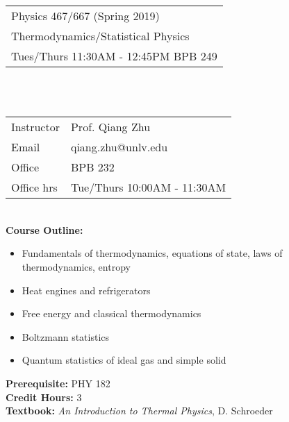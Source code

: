 %
\begin{tabular}{ l }
  \LARGE Physics 467/667 (Spring 2019)\\
  \LARGE Thermodynamics/Statistical Physics \\
  \LARGE Tues/Thurs 11:30AM - 12:45PM BPB 249 \\
\end{tabular}\\\\

\begin{tabular}{ l l }
  \large Instructor &\large Prof. Qiang Zhu \\
  \large Email      &\large qiang.zhu@unlv.edu \\
  \large Office     &\large BPB 232 \\
  \large Office hrs &\large Tue/Thurs 10:00AM - 11:30AM \\
\end{tabular}\\

\textbf {Course Outline:}
\begin{itemize} 
\item Fundamentals of thermodynamics, equations of state, laws of thermodynamics, entropy
\item Heat engines and refrigerators
\item Free energy and classical thermodynamics
\item Boltzmann statistics
\item Quantum statistics of ideal gas and simple solid
\end{itemize}

\textbf {Prerequisite:} PHY 182\\
\textbf {Credit Hours:} 3 \\
\textbf {Textbook:} \emph{An Introduction to Thermal Physics}, D. Schroeder\\

